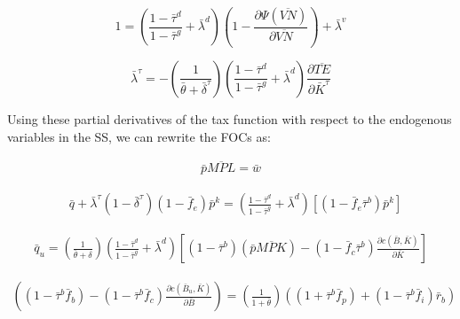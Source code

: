  \begin{equation}
\label{eqn:foc_vn_ss}
 1 = \left(\frac{1-\bar{\tau}^{d}}{1-\bar{\tau}^{g}} + \bar{\lambda}^{d}\right)\left(1-\frac{\partial \Psi(\overline{VN})}{\partial \overline{VN}}\right) + \bar{\lambda}^{v}
\end{equation}

 \begin{equation}
\label{eqn:foc_ktau_ss}
 \bar{\lambda}^{\tau} = -  \left(\frac{1}{\bar{\theta}+\bar{\delta}^{\tau}}\right)\left(\frac{1-\bar{\tau}^{d}}{1-\bar{\tau}^{g}} + \bar{\lambda}^{d} \right)\frac{\partial \overline{TE}}{\partial \bar{K}^{\tau}} 
\end{equation}

Using these partial derivatives of the tax function with respect to the endogenous variables in the SS, we can rewrite the FOCs as:


\begin{equation}
\label{eqn:foc_l_tax_ss}
\begin{split}
 \bar{p}\overline{MPL} = \bar{w} 
 \end{split}
\end{equation}

 \begin{equation}
\label{eqn:foc_i_tax_ss}
\begin{split}
 & \bar{q} + \bar{\lambda}^{\tau}(1-\bar{\delta}^{\tau})(1-\bar{f}_{e})\bar{p}^{k} =  \left(\frac{1-\bar{\tau}^{d}}{1-\bar{\tau}^{g}} + \bar{\lambda}^{d}\right)\left[(1-\bar{f}_{e}\bar{\tau}^{b})\bar{p}^{k}\right]
\end{split}
\end{equation}


 \begin{equation}
\label{eqn:foc_k_tax_ss}
\begin{split}
\bar{q}_{u} = \left(\frac{1}{\bar{\theta}+\delta}\right) \left(\frac{1-\bar{\tau}^{d}}{1-\bar{\tau}^{g}} + \bar{\lambda}^{d} \right)\left[(1-\bar{\tau}^{b})\left(\bar{p}\overline{MPK}\right)-(1-\bar{f}_{c}\bar{\tau}^{b}) \frac{\partial c(\bar{B},\bar{K})}{\partial \bar{K}} \right]
\end{split}
\end{equation}

 \begin{equation}
\label{eqn:foc_b_tax}
\begin{split}
 \left((1-\bar{\tau}^{b}\bar{f}_{b})-(1-\bar{\tau}^{b}\bar{f}_{c})\frac{\partial c(\bar{B}_{u},\bar{K})}{\partial \bar{B}}\right)=  \left(\frac{1}{1+\bar{\theta}}\right) \left((1+\bar{\tau}^{b}\bar{f}_{p})+(1-\bar{\tau}^{b}\bar{f}_{i})\bar{r}_{b}\right)
 \end{split}
\end{equation}

